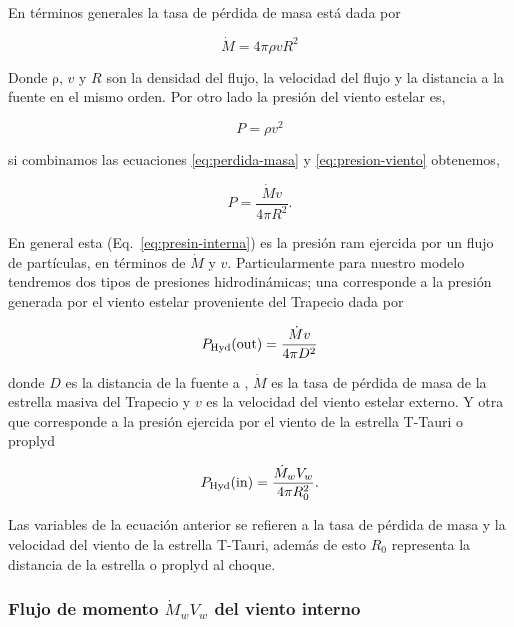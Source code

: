  En términos generales la tasa de pérdida de masa está dada por

\begin{equation}
  \label{eq:perdida-masa}
  \dot{M}=4\pi \rho v R^{2}
\end{equation}

Donde \(\mathrm{\rho}\), \(v\) y \(R\) son la densidad del flujo, la velocidad del flujo y la distancia a la fuente en el mismo orden. Por otro lado la presión del viento estelar es,

\begin{equation}
  \label{eq:presion-viento}
  P=\rho v^{2}
\end{equation}

si combinamos las ecuaciones \ref{eq:perdida-masa} y \ref{eq:presion-viento} obtenemos,

\begin{equation}
  \label{eq:presin-interna}
  P=\frac{\dot{M} v}{4 \pi R^{2}}. 
\end{equation}
 
En general esta (Eq.~\ref{eq:presin-interna}) es la presión ram ejercida por un flujo de partículas, en términos de \(\dot{M}\) y \(v\). Particularmente para nuestro modelo tendremos  dos tipos de presiones hidrodinámicas; una corresponde a la presión generada por el viento estelar proveniente del Trapecio dada por

\begin{equation}
  \label{eq:presion-externa}
   P_{\text{Hyd}}(\mathrm{out}{})=\frac{\dot{M}v}{4 \pi D^{2}}
\end{equation}

donde \(D\) es la distancia de la fuente a \thC{}, \(\dot{M}\) es la tasa de pérdida de masa de la estrella masiva del Trapecio y \(v\) es la velocidad del viento estelar externo. Y otra que corresponde a la presión ejercida por el viento de la estrella T-Tauri o proplyd

 
\begin{equation}
  \label{eq:presion-interna}
  P_{\text{Hyd}}(\mathrm{in}{})=\frac{\dot{M}_{w} V_{w}}{4 \pi R_{0}^{2}}.
\end{equation}

Las variables de la ecuación anterior se refieren a la tasa de pérdida de masa y la velocidad del viento de la estrella T-Tauri, además de esto \(R_{0}\) representa la distancia de la estrella o proplyd al choque.

\subsubsection{Flujo de momento \(\dot{M}_{w}V_{w}\) del viento interno}
\label{sec:momento}

